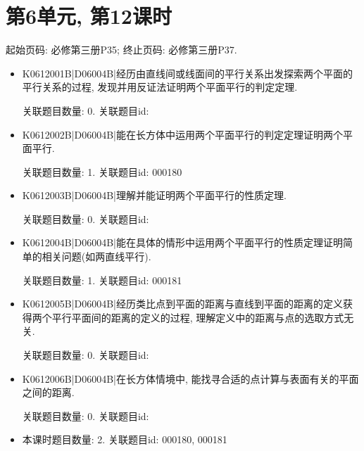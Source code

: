 \section*{第6单元, 第12课时}
起始页码: 必修第三册P35; 终止页码: 必修第三册P37.
\begin{itemize}
\item K0612001B|D06004B|经历由直线间或线面间的平行关系出发探索两个平面的平行关系的过程, 发现并用反证法证明两个平面平行的判定定理.

关联题目数量: 0. 关联题目id: 

\item K0612002B|D06004B|能在长方体中运用两个平面平行的判定定理证明两个平面平行.

关联题目数量: 1. 关联题目id: 000180

\item K0612003B|D06004B|理解并能证明两个平面平行的性质定理.

关联题目数量: 0. 关联题目id: 

\item K0612004B|D06004B|能在具体的情形中运用两个平面平行的性质定理证明简单的相关问题(如两直线平行).

关联题目数量: 1. 关联题目id: 000181

\item K0612005B|D06004B|经历类比点到平面的距离与直线到平面的距离的定义获得两个平行平面间的距离的定义的过程, 理解定义中的距离与点的选取方式无关.

关联题目数量: 0. 关联题目id: 

\item K0612006B|D06004B|在长方体情境中, 能找寻合适的点计算与表面有关的平面之间的距离.

关联题目数量: 0. 关联题目id: 

\item 本课时题目数量: 2. 关联题目id: 000180, 000181

\end{itemize}

